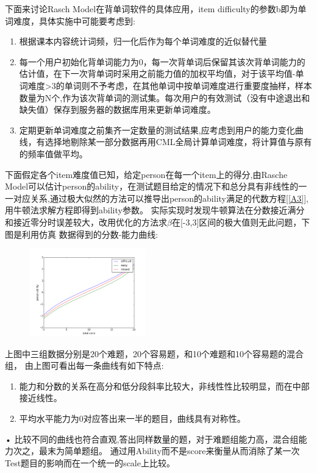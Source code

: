 \documentclass[xetex,mathserif,serif]{beamer}
\begin{document}
  \begin{frame}
    
    下面来讨论Rasch Model在背单词软件的具体应用，item difficulty的参数b即为单词难度，具体实施中可能要考虑到:
    \begin{enumerate}
\item{根据课本内容统计词频，归一化后作为每个单词难度的近似替代量}
\item{每一个用户初始化背单词能力为0，每一次背单词后保留其该次背单词能力的估计值，在下一次背单词时采用之前能力值的加权平均值，对于该平均值-单词难度>3的单词则不予考虑，在其他单词中按单词难度进行重要度抽样，样本数量为N个,作为该次背单词的测试集。每次用户的有效测试（没有中途退出和缺失值）保存到服务器的数据库用来更新单词难度。}
\item{定期更新单词难度之前集齐一定数量的测试结果,应考虑到用户的能力变化曲线，有选择地剔除某一部分数据再用CML全局计算单词难度，将计算值与原有的频率值做平均。}
\end{enumerate}
  \end{frame}
  \begin{frame}
    
    下面假定各个item难度值已知，给定person在每一个item上的得分,由Rasche Model可以估计person的ability，在测试题目给定的情况下和总分具有非线性的一一对应关系,通过极大似然的方法可以推导出person的ability满足的代数方程[\ref{A3}],用牛顿法求解方程即得到ability参数。
实际实现时发现牛顿算法在分数接近满分和接近零分时误差较大，改用优化的方法求$\beta$在[-3,3]区间的极大值则无此问题，下图是利用仿真
数据得到的分数-能力曲线:
\begin{figure}[!ht]
\includegraphics[height=1.5in]{scoring.png}
\end{figure}

  \end{frame}
  \begin{frame}
    
    上图中三组数据分别是20个难题，20个容易题，和10个难题和10个容易题的混合组，
由上图可看出每一条曲线有如下特点:
\begin{enumerate}
\item{能力和分数的关系在高分和低分段斜率比较大，非线性性比较明显，而在中部接近线性。}
\item{平均水平能力为0对应答出来一半的题目，曲线具有对称性。}
\end{enumerate}•
比较不同的曲线也符合直观,答出同样数量的题，对于难题组能力高，混合组能力次之，最末为简单题组。
通过用Ability而不是score来衡量从而消除了某一次Test题目的影响而在一个统一的scale上比较。
\end{frame} 
\end{document}
